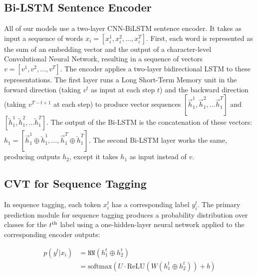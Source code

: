 \documentclass[11pt,a4paper]{article}
\newcommand\whethermath[1]{\ifmmode{#1}\else{$#1$}\fi}
\newcommand\uprm[1]{\whethermath{^{\hbox{\scriptsize #1}}}}
\newcommand{\alns}[1] {
	\begin{align*} #1 \end{align*}
}
\newcommand{\relu} {\text{ReLU}}
\newcommand{\hf} { \overrightarrow{h} }
\newcommand{\hb} { \overleftarrow{h} }
\newcommand{\mlp}{ \texttt{NN}}
\begin{document}
\subsection{Bi-LSTM Sentence Encoder}
All of our models use a two-layer CNN-BiLSTM \citep{chiu2015named,ma2016end} sentence encoder. 
It takes as input a sequence of words $x_i = [x_i^1, x_i^2, ..., x_i^T]$.
First, each word is represented as the sum of an embedding vector and the output of a character-level Convolutional Neural Network, resulting in a sequence of vectors $v = [v^1, v^2, ..., v^T]$.
The encoder applies a two-layer bidirectional LSTM \citep{graves2005framewise} to these representations. The first layer runs a Long Short-Term Memory unit \citep{hochreiter1997long} in the forward direction (taking $v^t$ as input at each step $t$) and the backward direction (taking $v^{T - t + 1}$ at each step) to produce vector sequences $[\hf^1_1, \hf_1^2, ... \hf_1^T]$ and $[\hb_1^1, \hb_1^2, ... \hb_1^T]$. The output of the Bi-LSTM is the concatenation of these vectors:
$
h_1 = [\hf_1^1 \oplus \hb_1^1, ..., \hf_1^T \oplus \hb_1^T]. 
$
The second Bi-LSTM layer works the same, producing outputs $h_2$, except it takes $h_1$ as input instead of $v$.


\subsection{CVT for Sequence Tagging}
\label{sec:tag}
In sequence tagging, each token $x^t_i$ has a corresponding label $y^t_i$. 
The primary prediction module for sequence tagging produces a probability distribution over classes for the $t\uprm{th}$ label using a one-hidden-layer neural network applied to the corresponding encoder outputs:
\alns{
   p(y^t|x_i) &= \mlp(h_1^t \oplus h_2^t) \\
   &= \text{softmax}(U\cdot \relu(W (h_1^t \oplus h_2^t)) + b)
}
\end{document}

